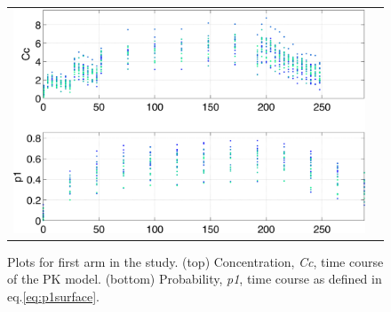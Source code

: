 \begin{figure}[htbp]
\centering
\begin{tabular}{cc}
\includegraphics[width=.6\textwidth]{pics/p1_armA} 
\end{tabular}
\caption{Plots for first arm in the study. (top) Concentration, \emph{Cc}, time course of the PK model. 
(bottom) Probability, \emph{p1}, time course as defined in eq.\ref{eq:p1surface}.}
\label{fig:p1timecourse}
\end{figure}


